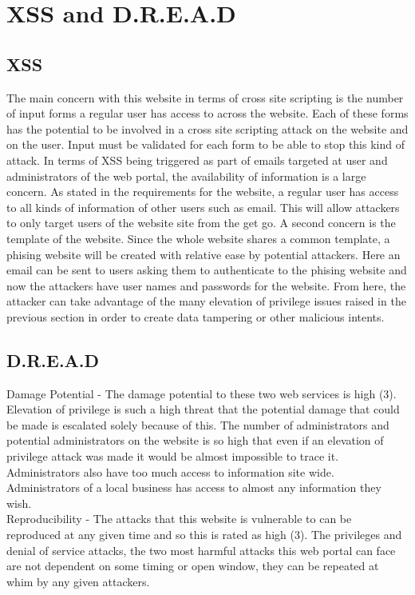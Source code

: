 \documentclass[paper=a4, fontsize=11pt]{scrartcl} %
\numberwithin{equation}{section} %
\numberwithin{figure}{section} %
\numberwithin{table}{section} %
\begin{document}
\section{XSS and D.R.E.A.D}

\subsection{XSS}

The main concern with this website in terms of cross site scripting is the number of input forms a regular user has access
to across the website. Each of these forms has the potential to be involved in a cross site scripting attack on the
website and on the user. Input must be validated for each form to be able to stop this kind of attack. In terms of
XSS being triggered as part of emails targeted at user and administrators of the web portal, the availability of
information is a large concern. As stated in the requirements for the website, a regular user has access to all kinds of
information of other users such as email. This will allow attackers to only target users of the website site from the
get go. A second concern is the template of the website. Since the whole website shares a common template, a phising website
will be created with relative ease by potential attackers. Here an email can be sent to users asking them to authenticate
to the phising website and now the attackers have user names and passwords for the website. From here, the attacker can
take advantage of the many elevation of privilege issues raised in the previous section in order to create data tampering
or other malicious intents.

\subsection{D.R.E.A.D}

Damage Potential - The damage potential to these two web services is high (3). Elevation of privilege is such a high threat
that the potential damage that could be made is escalated solely because of this. The number of administrators and potential
administrators on the website is so high that even if an elevation of privilege attack was made it would be almost impossible
to trace it. Administrators also have too much access to information site wide. Administrators of a local business has access
to almost any information they wish.\\

Reproducibility - The attacks that this website is vulnerable to can be reproduced at any given time and so this is rated
as high (3). The privileges and denial of service attacks, the two most harmful attacks this web portal can face are not
dependent on some timing or open window, they can be repeated at whim by any given attackers.\\
\end{document}
